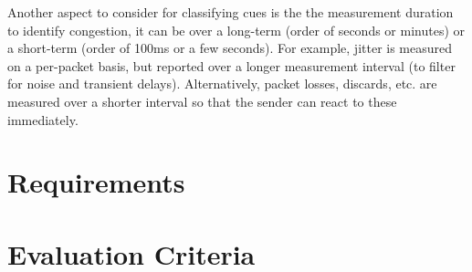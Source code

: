
Another aspect to consider for classifying cues is the the measurement
duration to identify congestion, it can be over a long-term (order of seconds
or minutes) or a short-term (order of 100ms or a few seconds). For example,
jitter is measured on a per-packet basis, but reported over a longer
measurement interval (to filter for noise and transient delays).
Alternatively, packet losses, discards, etc. are measured over a shorter
interval so that the sender can react to these immediately.

\section{Requirements}
\label{fw.cc.req}

\section{Evaluation Criteria}
\label{fw.cc.eval}

